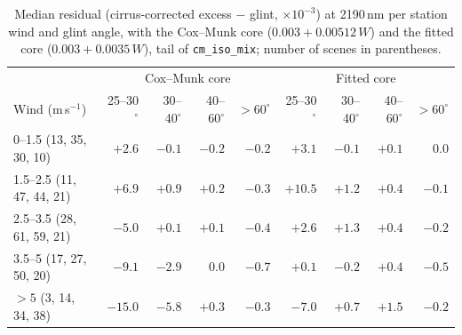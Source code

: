 \documentclass[11pt,a4paper]{article}
\newcommand{\code}[1]{\texttt{#1}}
\begin{document}
\begin{table}[h]
\centering\small
\caption{Median residual (cirrus-corrected excess $-$ glint, $\times10^{-3}$) at 2190\,nm per station wind and
glint angle, with the Cox--Munk core ($0.003 + 0.00512\,W$) and the fitted core ($0.003 + 0.0035\,W$), tail of
\code{cm\_iso\_mix}; number of scenes in parentheses.}
\label{tab:glint_wind}
\begin{tabular}{lrrrr|rrrr}
\toprule
 & \multicolumn{4}{c|}{Cox--Munk core} & \multicolumn{4}{c}{Fitted core} \\
Wind (m\,s$^{-1}$) & 25--30$^\circ$ & 30--40$^\circ$ & 40--60$^\circ$ & $>60^\circ$ &
  25--30$^\circ$ & 30--40$^\circ$ & 40--60$^\circ$ & $>60^\circ$ \\
\midrule
0--1.5 (13, 35, 30, 10)   & $+2.6$  & $-0.1$ & $-0.2$ & $-0.2$ & $+3.1$  & $-0.1$ & $+0.1$ & $0.0$ \\
1.5--2.5 (11, 47, 44, 21) & $+6.9$  & $+0.9$ & $+0.2$ & $-0.3$ & $+10.5$ & $+1.2$ & $+0.4$ & $-0.1$ \\
2.5--3.5 (28, 61, 59, 21) & $-5.0$  & $+0.1$ & $+0.1$ & $-0.4$ & $+2.6$  & $+1.3$ & $+0.4$ & $-0.2$ \\
3.5--5 (17, 27, 50, 20)   & $-9.1$  & $-2.9$ & $0.0$  & $-0.7$ & $+0.1$  & $-0.2$ & $+0.4$ & $-0.5$ \\
$>5$ (3, 14, 34, 38)      & $-15.0$ & $-5.8$ & $+0.3$ & $-0.3$ & $-7.0$  & $+0.7$ & $+1.5$ & $-0.2$ \\
\bottomrule
\end{tabular}
\end{table}
\end{document}
